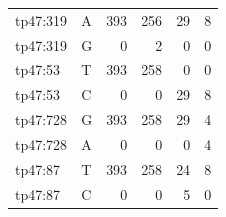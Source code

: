 \begin{table}[ht]
\begin{tabular}{llrrrr}
  tp47:319 & A & 393 & 256 & 29 & 8 \\ 
  tp47:319 & G & 0 & 2 & 0 & 0 \\ 
  tp47:53 & T & 393 & 258 & 0 & 0 \\ 
  tp47:53 & C & 0 & 0 & 29 & 8 \\ 
  tp47:728 & G & 393 & 258 & 29 & 4 \\ 
  tp47:728 & A & 0 & 0 & 0 & 4 \\ 
  tp47:87 & T & 393 & 258 & 24 & 8 \\ 
  tp47:87 & C & 0 & 0 & 5 & 0 \\ 
   \bottomrule
\end{tabular}
\end{table}
